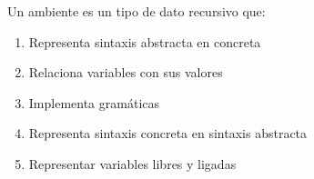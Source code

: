 {
Un ambiente es un tipo de dato recursivo que:
	\begin{enumerate}
		\item Representa sintaxis abstracta en concreta
		\item Relaciona variables con sus valores %
		\item Implementa gramáticas
		\item Representa sintaxis concreta en sintaxis abstracta
		\item Representar variables libres y ligadas
	\end{enumerate}
}
